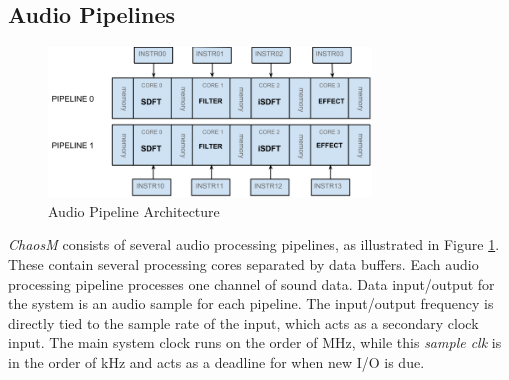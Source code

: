 \FloatBarrier
\subsection{Audio Pipelines}\label{subsec:audio_pipelines}

\begin{figure}[H]
    \centering
    \includegraphics[height=150px]{figures/fpga/system_components_general_pipeline.png}
    \caption{Audio Pipeline Architecture}
    \label{fig:pipeline_architecture}
\end{figure}

\textit{ChaosM} consists of several audio processing pipelines, as illustrated in
Figure \ref{fig:pipeline_architecture}. These contain several processing cores
separated by data buffers. Each audio processing pipeline processes one channel
of sound data. Data input/output for the system is an audio sample for each pipeline. 
The input/output frequency is directly tied to the sample rate of the input, which acts as a secondary clock input. The main system clock runs on the order of MHz, while this \textit{sample clk} is in the order of kHz and acts as a deadline for when new I/O is due.
